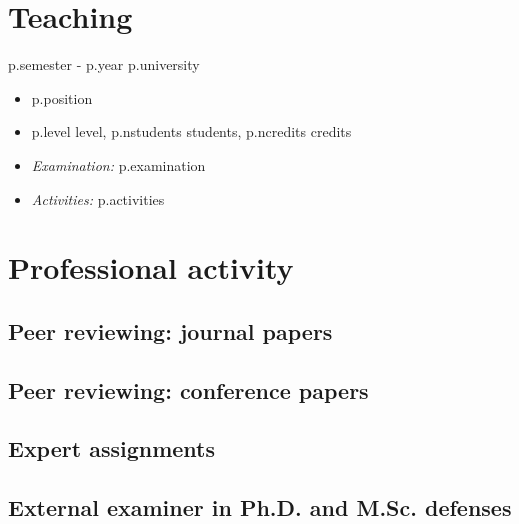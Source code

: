 \documentclass[10pt,letterpaper]{article} %
\begin{document}
{{{{{{{{{{{{{{\section*{Teaching}

{%
    {   {{ p.semester }} - {{ p.year }}  }
    { {{ p.university }} }
    { }
    {}
    \begin{itemize}
        \item {{ p.position }}
        \item {{ p.level }} level, {{ p.nstudents }} students, {{ p.ncredits }} credits
        \item \emph{Examination:} {{ p.examination }}
        \item \emph{Activities:}  {{ p.activities }}
    \end{itemize}
    {%




\section*{Professional activity}

\subsection*{Peer reviewing: journal papers}

{%

\subsection*{Peer reviewing: conference papers}

{%

\subsection*{Expert assignments}

{%

\subsection*{External examiner in Ph.D. and M.Sc. defenses}

}}}}}}}}}}}}}}}}}}}
\end{document}
